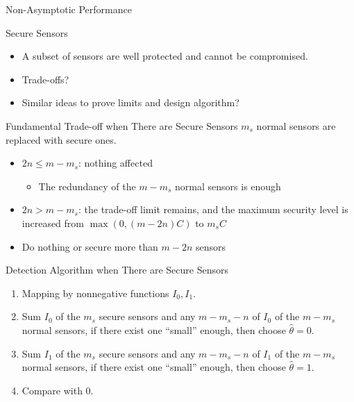 \documentclass[10pt]{beamer}
\newcommand{\tikzdir}[1]{#1.tikz}
\newcommand{\inputtikz}[1]{}}
\begin{document}
\begin{frame}{Non-Asymptotic Performance}
      \begin{center}
        \inputtikz{finite_time}
      \end{center}
\end{frame}



\begin{frame}{Secure Sensors}
\begin{itemize}
\item A subset of sensors are well protected and cannot be compromised.
\item Trade-offs?
\item Similar ideas to prove limits and design algorithm?
\end{itemize}
\end{frame}

\begin{frame}{Fundamental Trade-off when There are Secure Sensors}
$m_s$ normal sensors are replaced with secure ones.
\begin{itemize}
\item $2n \leq m-m_s$: nothing affected
\begin{itemize}
  \item The redundancy of the $m-m_s$ normal sensors is enough
\end{itemize}
\item $2n > m-m_s$: the trade-off limit remains, and the maximum security level is increased from $\max(0,(m-2n)C)$ to $m_sC$
\item Do nothing or secure more than $m-2n$ sensors
\end{itemize}
\end{frame}

\begin{frame}{Detection Algorithm when There are Secure Sensors}
   \begin{enumerate}
   \item Mapping by nonnegative functions $I_0,I_1$.
  \item Sum $I_0$ of the $m_s$ secure sensors and any $m-m_s-n$ of $I_0$ of the $m-m_s$ normal sensors, if there exist one ``small'' enough, then choose $\hat \theta = 0$.
  \item Sum $I_1$ of the $m_s$ secure sensors and any $m-m_s-n$ of $I_1$ of the $m-m_s$ normal sensors, if there exist one ``small'' enough, then choose $\hat \theta = 1$.
  \item Compare with $0$.
  \end{enumerate}
\end{frame}
\end{document}
